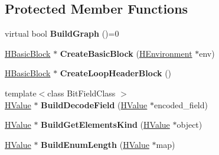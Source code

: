 \subsection*{Protected Member Functions}
\begin{DoxyCompactItemize}
\item 
virtual bool {\bfseries Build\+Graph} ()=0\hypertarget{classv8_1_1internal_1_1_h_graph_builder_aa19a143d4cb7c32470dbbdcba779e4fa}{}\label{classv8_1_1internal_1_1_h_graph_builder_aa19a143d4cb7c32470dbbdcba779e4fa}

\item 
\hyperlink{classv8_1_1internal_1_1_h_basic_block}{H\+Basic\+Block} $\ast$ {\bfseries Create\+Basic\+Block} (\hyperlink{classv8_1_1internal_1_1_h_environment}{H\+Environment} $\ast$env)\hypertarget{classv8_1_1internal_1_1_h_graph_builder_a8f6a5e6dd76ebb1fdd185a397d1fbc9c}{}\label{classv8_1_1internal_1_1_h_graph_builder_a8f6a5e6dd76ebb1fdd185a397d1fbc9c}

\item 
\hyperlink{classv8_1_1internal_1_1_h_basic_block}{H\+Basic\+Block} $\ast$ {\bfseries Create\+Loop\+Header\+Block} ()\hypertarget{classv8_1_1internal_1_1_h_graph_builder_ab71ffdb40e1b709eb46fc952b68031b9}{}\label{classv8_1_1internal_1_1_h_graph_builder_ab71ffdb40e1b709eb46fc952b68031b9}

\item 
{\footnotesize template$<$class Bit\+Field\+Class $>$ }\\\hyperlink{classv8_1_1internal_1_1_h_value}{H\+Value} $\ast$ {\bfseries Build\+Decode\+Field} (\hyperlink{classv8_1_1internal_1_1_h_value}{H\+Value} $\ast$encoded\+\_\+field)\hypertarget{classv8_1_1internal_1_1_h_graph_builder_a764d9af5f3d100ed14c397660b6b0735}{}\label{classv8_1_1internal_1_1_h_graph_builder_a764d9af5f3d100ed14c397660b6b0735}

\item 
\hyperlink{classv8_1_1internal_1_1_h_value}{H\+Value} $\ast$ {\bfseries Build\+Get\+Elements\+Kind} (\hyperlink{classv8_1_1internal_1_1_h_value}{H\+Value} $\ast$object)\hypertarget{classv8_1_1internal_1_1_h_graph_builder_a03c19286a098c5ce55a1877a09b3d5dc}{}\label{classv8_1_1internal_1_1_h_graph_builder_a03c19286a098c5ce55a1877a09b3d5dc}

\item 
\hyperlink{classv8_1_1internal_1_1_h_value}{H\+Value} $\ast$ {\bfseries Build\+Enum\+Length} (\hyperlink{classv8_1_1internal_1_1_h_value}{H\+Value} $\ast$map)\hypertarget{classv8_1_1internal_1_1_h_graph_builder_aa7b0e163ff67763495450304e3279c82}{}\label{classv8_1_1internal_1_1_h_graph_builder_aa7b0e163ff67763495450304e3279c82}


\end{DoxyCompactItemize}
